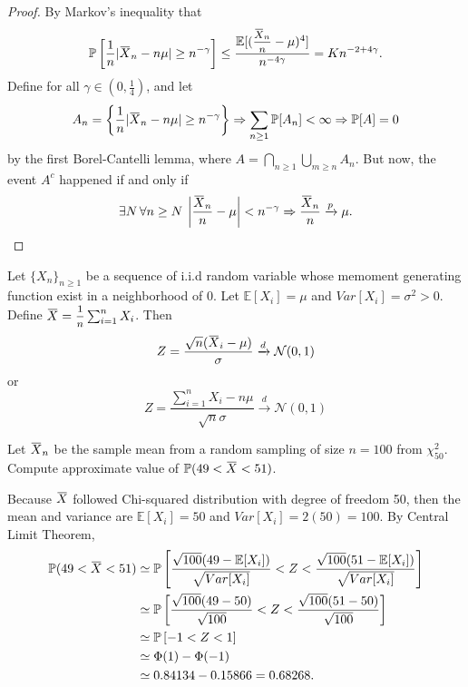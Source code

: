 \begin{proof}
    By Markov's inequality that 
    \[
        \mathbb{P} \left[ \frac{1}{n}|\ols{X}_n - n\mu| \geq n^{-\gamma}\right] 
        \leq \frac{\mathbb{E}[(\mfrac{\ols{X}_n}{n} - \mu)^4]}{n^{-4\gamma}} = Kn^{-2+4\gamma}.
    \]
    Define for all $\gamma \in \left(0, \frac{1}{4}\right)$, and let 
    \[
        A_n = \left\{ \frac{1}{n}|\ols{X}_n - n\mu| \geq n^{-\gamma} \right\} \Rightarrow 
        \sum_{n \geq 1} \mathbb{P}[A_n] < \infty \Rightarrow 
        \mathbb{P}[A] = 0
    \]
    by the first Borel-Cantelli lemma, where $A = \bigcap_{n \geq 1} \bigcup_{m \geq n} A_n$. But now, the event 
    $A^c$ happened if and only if 
    \[
        \exists N\, \forall n \geq N \> \left| \frac{\ols{X}_n}{n} - \mu \right| < n^{-\gamma} 
        \Rightarrow \frac{\ols{X}_n}{n} \xrightarrow[]{p} \mu.
    \]
\end{proof}

\begin{theorem}
    Let $\{X_n\}_{n \geq 1}$ be a sequence of i.i.d random variable whose memoment generating function 
    exist in a neighborhood of 0. Let $\mathbb{E}[X_i] = \mu$ and $Var[X_i] = \sigma^2 > 0$. Define
    $\ols{X} = \mfrac{1}{n} \sum^n_{i=1} X_i$. Then 
    \begin{equation}
        Z = \frac{\sqrt{n} (\ols{X}_i - \mu)}{\sigma} \xrightarrow[]{d} \mathcal{N}(0,1)
    \end{equation}
    or 
    \begin{equation}
        Z = \frac{\sum^n_{i=1} X_i - n\mu}{\sqrt{n} \sigma} \xrightarrow[]{d} \mathcal{N}(0,1)
    \end{equation}
\end{theorem}

\begin{example}
    Let $\ols{X}_n$ be the sample mean from a random sampling of size 
    $n = 100$ from $\chi^2_{50}$. Compute approximate value of 
    $\mathbb{P}(49 < \ols{X} < 51)$.
\end{example}
\begin{solution}
    Because $\ols{X}$ followed Chi-squared distribution with degree of freedom 50, then the mean and variance are 
    $\mathbb{E}[X_i] = 50$ and $Var[X_i] = 2(50) = 100$. By Central Limit Theorem, 
    \begin{align*}
        \mathbb{P}(49 < \ols{X} < 51) &\simeq  
        \mathbb{P} \left[ \frac{\sqrt{100} (49 - \mathbb{E}[X_i])}{\sqrt{Var[X_i]}} < Z < \frac{\sqrt{100} (51 - \mathbb{E}[X_i])}{\sqrt{Var[X_i]}} \right]\\
        &\simeq \mathbb{P} \left[ \frac{\sqrt{100} (49 - 50)}{\sqrt{100}} < Z < \frac{\sqrt{100} (51 - 50)}{\sqrt{100}} \right]\\
        &\simeq \mathbb{P} \left[ -1 < Z < 1 \right]\\
        &\simeq \Phi(1) - \Phi(-1)\\
        &\simeq 0.84134 - 0.15866 = 0.68268.
    \end{align*} 
\end{solution}

